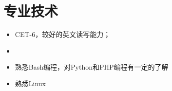 \documentclass[margin]{res}
\begin{document}
\section{专业技术}
\begin{itemize}
    \item CET-6，较好的英文读写能力；
    \item 
    \item 熟悉Bash编程，对Python和PHP编程有一定的了解
    \item 熟悉Linux
\end{itemize}


\end{document}
